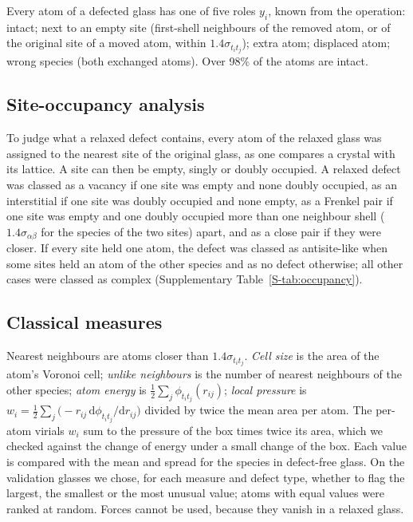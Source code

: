 \documentclass[11pt]{article}
\newcommand{\supp}[1]{Supplementary Table~\ref{S-#1}}
\begin{document}
Every atom of a defected glass has one of five roles $y_i$, known from the operation: intact; next to an empty site (first-shell neighbours of the removed atom, or of the original site of a moved atom, within $1.4\sigma_{t_it_j}$); extra atom; displaced atom; wrong species (both exchanged atoms). Over 98\% of the atoms are intact.

\subsection*{Site-occupancy analysis}
To judge what a relaxed defect contains, every atom of the relaxed glass was assigned to the nearest site of the original glass, as one compares a crystal with its lattice. A site can then be empty, singly or doubly occupied. A relaxed defect was classed as a vacancy if one site was empty and none doubly occupied, as an interstitial if one site was doubly occupied and none empty, as a Frenkel pair if one site was empty and one doubly occupied more than one neighbour shell ($1.4\sigma_{\alpha\beta}$ for the species of the two sites) apart, and as a close pair if they were closer. If every site held one atom, the defect was classed as antisite-like when some sites held an atom of the other species and as no defect otherwise; all other cases were classed as complex (\supp{tab:occupancy}).

\subsection*{Classical measures}
Nearest neighbours are atoms closer than $1.4\sigma_{t_it_j}$. \emph{Cell size} is the area of the atom's Voronoi cell\citep{starr2002}; \emph{unlike neighbours} is the number of nearest neighbours of the other species; \emph{atom energy} is $\tfrac12\sum_j\phi_{t_it_j}(r_{ij})$; \emph{local pressure} is $w_i=\tfrac12\sum_j\big(-r_{ij}\,\mathrm{d}\phi_{t_it_j}/\mathrm{d}r_{ij}\big)$ divided by twice the mean area per atom. The per-atom virials $w_i$ sum to the pressure of the box times twice its area, which we checked against the change of energy under a small change of the box. Each value is compared with the mean and spread for the species in defect-free glass. On the validation glasses we chose, for each measure and defect type, whether to flag the largest, the smallest or the most unusual value; atoms with equal values were ranked at random. Forces cannot be used, because they vanish in a relaxed glass.
\end{document}

